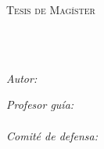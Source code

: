 \documentclass[
11pt, %
oneside, %
spanish, %
singlespacing, %
parskip, %
headsepline, %
table
]{MastersDoctoralThesis} %
\author{Benjamín Schindler} %
\begin{document}
\frontmatter %

\pagestyle{plain} %


\begin{titlepage}
\begin{center}

\vspace*{.04\textheight}
{\scshape\LARGE \univname\par}\vspace{1cm} %
\textsc{\Large Tesis de Magíster}\\[0.4cm] %

\HRule \\[0.3cm] %
{\LARGE \bfseries \ttitle\par}\vspace{0.3cm} %
\HRule \\[1cm] %
 
\begin{minipage}[t]{0.4\textwidth}
\begin{flushleft} \large
\emph{Autor:}\\
{\authorname} %
\end{flushleft}
\end{minipage}
\begin{minipage}[t]{0.4\textwidth}
\begin{flushright} \large
\emph{Profesor guía:} \\
\supname\\
\vspace{5mm}
\emph{Comité de defensa:} \\
\examname\\
\end{flushright}
\end{minipage}\\[1.5cm]
 

\end{center}
\end{titlepage}
\end{document}
